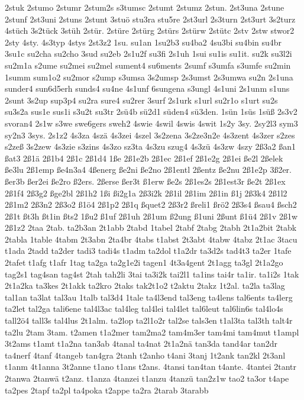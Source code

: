 {2stuk
2stumo
2stumr
2stum2s
s3tumsc
2stumt
2stumz
2stun.
2st3una
2stune
2stunf
2st3uni
2stuns
2stunt
3stuö
stu3ra
stu5re
2st3url
2s3turn
2st3urt
3s2turz
4stüch
3s2tück
3stüh
2stür.
2stüre
2stürg
2stürs
2stürw
2stütc
2stv
2stw
stwor2
2sty
4sty.
4s3typ
4stys
2st3z2
1su.
su1an
1su2b3
su4ba2
4su3bi
su4bin
su4br
3su1c
su2cha
su2cho
3sud
su2eb
2s1u2f
su3fi
2s1uh
1sui
su1is
su1it.
su2k
su3l2i
su2m1a
s2ume
su2mei
su2mel
sument4
su6ments
2sumf
s3umfa
s3umfe
su2min
1summ
sum1o2
su2mor
s2ump
s3umsa
3s2umsp
2s3umst
2s3umwa
su2n
2s1una
sunder4
sun6d5erh
sunds4
su4ne
4s1unf
6sungena
s3ungl
4s1uni
2s1unm
s1uns
2sunt
3s2up
sup3p4
su2ra
sure4
su2rer
3surf
2s1urk
s1url
su2r1o
s1urt
su2s
su3s2a
sus1e
sus1i
s3u2t
su3tr
2sü4b
sü2d1
süden4
sü3den.
1sün
1süs
1süß
2s3v2
svoran4
2s1w
s3we
swe6gers
sweh2
4swie
4swil
4swis
4swit
1s2y
3sy.
2sy2l3
sym3
sy2n3
3sys.
2s1z2
4s3za
4szä
4s3zei
4szel
3s2zena
3s2ze3n2e
4s3zent
4s3zer
s2zes
s2zeß
3s2zew
4s3zie
s3zins
4s3zo
sz3ta
4s3zu
szug4
4s3zü
4s3zw
4szy
2ß3a2
ßan1
ßat3
2ß1ä
2ß1b4
2ß1c
2ß1d4
1ße
2ß1e2b
2ß1ec
2ß1ef
2ß1e2g
2ß1ei
ße2l
2ßelek
ße3lu
2ß1emp
ße4n3a4
4ßenerg
ße2ni
ße2no
2ß1entl
2ßentz
ße2nu
2ß1e2p
3ß2er.
ßer3b
ßer2ei
ße2ro
ß2ers.
2ßerse
ßer3t
ß1erw
ße2s
2ß1es2s
2ß1est3r
ße2t
2ß1ex
2ß1f4
2ß3g2
ßge2bl
2ß1h2
1ßi
ßi2g1a
2ß3i2k
2ß1il
2ß1im
2ß1in
ß1j
2ß3k4
2ß1l2
2ß1m2
2ß3n2
2ß3o2
ß1ö4
2ß1p2
2ß1q
ßquet2
2ß3r2
ßreli1
ßrö2
2ß3s4
ßsau4
ßsch2
2ß1t
ßt3h
ßt1in
ßts2
1ßu2
ß1uf
2ß1uh
2ß1um
ß2ung
ß1uni
2ßunt
ß1ü4
2ß1v
2ß1w
2ß1z2
2taa
2tab.
ta2b3an
2t1abb
2tabd
1tabel
2tabf
2tabg
2tabh
2t1a2bit
2tabk
2tabla
1table
4tabm
2t3abn
2ta4br
4tabs
t1abst
2t3abt
4tabw
4tabz
2t1ac
3tacu
t1ada
2tadd
ta2der
tadi3
tadi4s
t1adm
ta2dol
t1a2dr
ta3d2s
tad4t3
ta2er
1tafe
2tafet
t1afg
t1afr
1tag
ta2ga
ta2g1e2i
tagen1
4t3a4gent
2t1agg
ta3gl
2t1a2go
tag2s1
tag4san
tag4st
2tah
tah2li
3tai
ta3i2k
tai2l1
ta1ins
tai4r
ta1ir.
ta1i2s
1tak
2t1a2ka
ta3kes
2t1akk
ta2kro
2taks
tak2t1o2
t2aktu
2takz
1t2al.
ta2la
ta3lag
tal1an
ta3lat
tal3au
1talb
tal3d4
1tale
ta4l3end
tal3eng
ta4lens
tal6ents
ta4lerg
ta2let
tal2ga
tali6ene
tal4l3ac
tal4leg
tal4lei
tal4let
tal6leut
tal6lin6s
tal4lo4s
tall2ö4
tall3s
tal4lus
2t1alm.
ta2lop
ta2l1o2r
tal2se
tals3en
t1al3ta
tal3th
talt4r
ta2lu
2tam
3tam.
t2amen
t1a2mer
tam2ma2
tam4m3er
tam4mi
tam4mut
t1ampl
3t2ams
t1amt
t1a2na
tan3ab
4tanal
ta4nat
2t1a2nä
tan3da
tand4ar
tan2dr
ta4nerf
4tanf
4tangeb
tan4gra
2tanh
t2anho
t4ani
3tanj
1t2ank
tan2kl
2t3anl
t1anm
4t1anna
3t2anne
t1ano
t1ans
t2ans.
4tansi
tan4tan
t4ante.
4tantei
2tantr
2tanwa
2tanwä
t2anz.
t1anza
4tanzei
t1anzu
4tanzü
tan2z1w
tao2
ta3or
t4ape
ta2pes
2tapf
ta2pl
ta4poka
t2appe
ta2ra
2tarab
3tarabb
}
